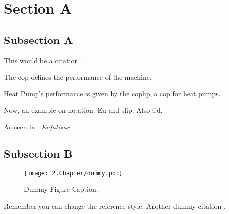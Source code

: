 \section{Section A}
\label{sec:sectiona}

\subsection{Subsection A}
\label{subsec:subasectionA}

This would be a citation \cite{dummy}.

The \gls{cop} defines the performance of the machine.

Heat Pump's performance is given by the \gls{cophp}, a \gls{cop} for heat pumps.

Now, an example on notation: \gls{Eu} and \gls{slip}.
Also \gls{Cd}.

As seen in \cite{wiki}. \emph{Enfatizar}

\subsection{Subsection B}
\label{subsec:subbsectiona}

\begin{figure}[H]
	\centering
		\texttt{[image: 2.Chapter/dummy.pdf]}
	\caption[Dummy Figure Caption for List of Figures.]{Dummy Figure Caption.}
	\label{fig:dummyfigure1}
\end{figure}

Remember you can change the reference style. Another dummy citation \cite{site}.